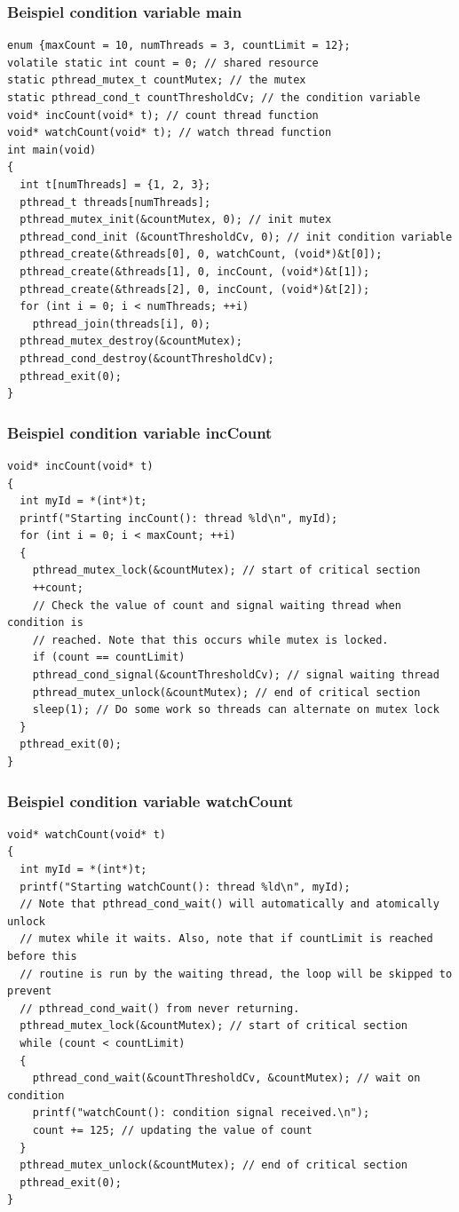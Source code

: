 \subsubsection{Beispiel condition variable main}
\begin{lstlisting}
enum {maxCount = 10, numThreads = 3, countLimit = 12};
volatile static int count = 0; // shared resource
static pthread_mutex_t countMutex; // the mutex
static pthread_cond_t countThresholdCv; // the condition variable
void* incCount(void* t); // count thread function
void* watchCount(void* t); // watch thread function
int main(void)
{
  int t[numThreads] = {1, 2, 3};
  pthread_t threads[numThreads];
  pthread_mutex_init(&countMutex, 0); // init mutex
  pthread_cond_init (&countThresholdCv, 0); // init condition variable
  pthread_create(&threads[0], 0, watchCount, (void*)&t[0]);
  pthread_create(&threads[1], 0, incCount, (void*)&t[1]);
  pthread_create(&threads[2], 0, incCount, (void*)&t[2]);
  for (int i = 0; i < numThreads; ++i)
    pthread_join(threads[i], 0);
  pthread_mutex_destroy(&countMutex);
  pthread_cond_destroy(&countThresholdCv);
  pthread_exit(0);
}
\end{lstlisting}

\subsubsection{Beispiel condition variable incCount}
\begin{lstlisting}
void* incCount(void* t)
{
  int myId = *(int*)t;
  printf("Starting incCount(): thread %ld\n", myId);
  for (int i = 0; i < maxCount; ++i)
  {
    pthread_mutex_lock(&countMutex); // start of critical section
    ++count;
    // Check the value of count and signal waiting thread when condition is
    // reached. Note that this occurs while mutex is locked.
    if (count == countLimit)
    pthread_cond_signal(&countThresholdCv); // signal waiting thread
    pthread_mutex_unlock(&countMutex); // end of critical section
    sleep(1); // Do some work so threads can alternate on mutex lock
  }
  pthread_exit(0);
}
\end{lstlisting}

\subsubsection{Beispiel condition variable watchCount}
\begin{lstlisting}
void* watchCount(void* t)
{
  int myId = *(int*)t;
  printf("Starting watchCount(): thread %ld\n", myId);
  // Note that pthread_cond_wait() will automatically and atomically unlock
  // mutex while it waits. Also, note that if countLimit is reached before this
  // routine is run by the waiting thread, the loop will be skipped to prevent
  // pthread_cond_wait() from never returning.
  pthread_mutex_lock(&countMutex); // start of critical section
  while (count < countLimit)
  {
    pthread_cond_wait(&countThresholdCv, &countMutex); // wait on condition
    printf("watchCount(): condition signal received.\n");
    count += 125; // updating the value of count
  }
  pthread_mutex_unlock(&countMutex); // end of critical section
  pthread_exit(0);
}
\end{lstlisting}

